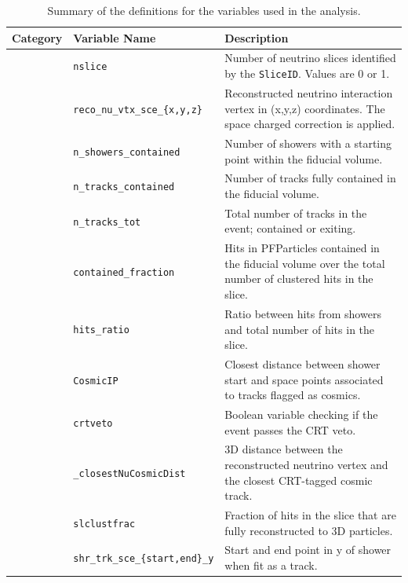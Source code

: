 \begin{table}[ht]
\caption{\label{tab:variableSummary} Summary of the definitions for the variables used in the analysis.}
\centering
\begin{tabular}{ m{} | m{} | m{}  }
Category & Variable Name & Description  \\
\hline

\multicolumn{1}{l|}{} & \texttt{nslice} &  Number of neutrino slices identified by the \texttt{SliceID}. Values are  0 or 1.\\  \cline{2-3}
\multicolumn{1}{l|}{} & \texttt{reco\_nu\_vtx\_sce\_\{x,y,z\}} & Reconstructed neutrino interaction vertex in (x,y,z) coordinates. The space charged correction is applied.  \\  \cline{2-3}
\multicolumn{1}{l|}{} & \texttt{n\_showers\_contained} & Number of showers with a starting point within the fiducial volume. \\  \cline{2-3}
\multicolumn{1}{l|}{} & \texttt{n\_tracks\_contained} & Number of tracks fully contained in the fiducial volume.  \\  \cline{2-3}
\multicolumn{1}{l|}{} & \texttt{n\_tracks\_tot} & Total number of tracks in the event; contained or exiting.  \\  \cline{2-3}
\multicolumn{1}{l|}{} & \texttt{contained\_fraction} & Hits in PFParticles contained in the fiducial volume over the total number of clustered hits in the slice.  \\  \cline{2-3}
\parbox[t]{2mm}{} & \texttt{hits\_ratio} & Ratio between hits from showers and total number of hits in the slice. \\  
 & \texttt{CosmicIP} & Closest distance between shower start and space points associated to tracks flagged as cosmics. \\  
 & \texttt{crtveto} & Boolean variable checking if the event passes the CRT veto. \\  
 & \texttt{\_closestNuCosmicDist} &  3D distance between the reconstructed neutrino vertex and the closest CRT-tagged cosmic track. \\  
 & \texttt{slclustfrac} & Fraction of hits in the slice that are fully reconstructed to 3D particles. \\  
 & \texttt{shr\_trk\_sce\_\{start,end\}\_y} &  Start and end point in y of shower when fit as a track.    \\ 

\end{tabular}
\end{table}
